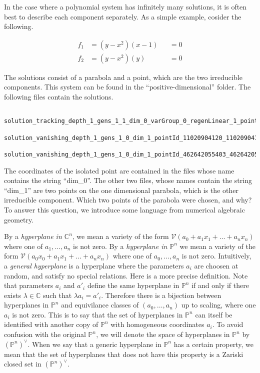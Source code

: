 \documentclass[12pt]{article}
\theoremstyle{definition}
\newcommand{\C}{\mathbb{C}}
\newcommand{\PP}{\mathbb{P}}
\begin{document}
In the case where a polynomial system has infinitely many solutions, it is 
often best to describe each component separately. As a simple example, 
cosider the following.

\begin{align*}
   f_1 &= (y-x^2)(x-1) &&= 0\\
   f_2 &= (y-x^2)(y) &&= 0
\end{align*}

The solutions consist of a parabola and a point, which are the two 
irreducible components. This system can be found in the 
``positive-dimensional'' folder. The following files contain the solutions.
\begin{leftbar}
\vspace{-10pt} 
\begin{verbatim}
      solution_tracking_depth_1_gens_1_1_dim_0_varGroup_0_regenLinear_1_pointId_151979748598_138051236175
      solution_vanishing_depth_1_gens_1_0_dim_1_pointId_11020904120_11020904120
      solution_vanishing_depth_1_gens_1_0_dim_1_pointId_462642055403_462642055403
\end{verbatim}\vspace{-10pt} 
\end{leftbar}

The coordinates of the isolated point are contained in the files whose 
name contains the string ``dim\_0''. The other two files, whose names 
contain the string ``dim\_1'' are two points on the one dimensional 
parabola, which is the other irreducible component. Which two points of 
the parabola were chosen, and why? To answer this question, we introduce 
some language from numerical algebraic geometry.

By a \emph{hyperplane in $\C^n$}, we mean a variety of the form 
$\mathcal{V}(a_0 + a_1x_1 + \ldots + a_nx_n)$ where one of $a_1, \ldots, 
a_n$ is not zero. By a \emph{hyperplane in 
$\PP^n$} we mean a variety of the form $\mathcal{V}(a_0x_0 + a_1x_1 
+ \ldots + a_nx_n)$ where one of $a_0, \ldots, a_n$ is not zero. 
Intuitively, a \emph{general hyperplane} is a 
hyperplane where the parameters $a_i$ are choosen at random, and satisfy 
no special relations. Here is a more precise definition. Note that 
parameters $a_i$ and $a'_i$ define the same hyperplane in $\PP^n$ if and 
only if there exists $\lambda \in \C$ such that $\lambda a_i = a'_i$. Therefore 
there is a bijection between hyperplanes in $\PP^n$ and equivilance 
classes of $(a_0, \ldots, a_n)$ up to scaling, where one $a_i$ is not 
zero. This is to say that the set of hyperplanes in $\PP^n$ can itself be 
identified with another copy of $\PP^n$ with homogeneous coordinates 
$a_i$. To avoid confusion with the original $\PP^n$, we will denote the 
space of hyperplanes in $\PP^n$ by $(\PP^n)^\vee$. When we say that a 
generic hyperplane in $\PP^n$ has a certain property, we mean that the 
set of hyperplanes that does not have this property is a Zariski closed 
set in $(\PP^n)^\vee$.
\end{document}
